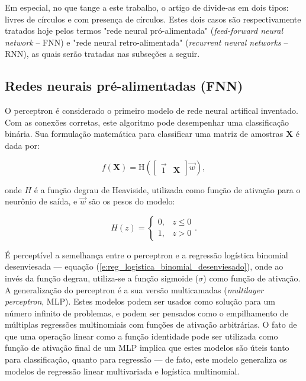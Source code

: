     Em especial, no que tange a este trabalho, o artigo de  divide-as em dois tipos: livres de círculos e com presença de círculos. Estes dois casos são respectivamente tratados hoje pelos termos "rede neural pró-alimentada" (\textit{feed-forward neural network} -- FNN) e "rede neural retro-alimentada" (\textit{recurrent neural networks} -- RNN), as quais serão tratadas nas subseções a seguir.

    \subsection{Redes neurais pré-alimentadas (FNN)} \label{s:fnn}

      O perceptron  é considerado o primeiro modelo de rede neural artifical inventado. Com as conexões corretas, este algoritmo pode desempenhar uma classificação binária. Sua formulação matemática para classificar uma matriz de amostras $\boldsymbol{X}$ é dada por:

    \begin{equation} \label{e:perceptron_original}
      f(\boldsymbol{X}) = \text{H}\left( \begin{bmatrix} \vec{1} & \boldsymbol{X}\end{bmatrix} \vec{w} \right)
      ,
    \end{equation}

    \noindent onde $H$ é a função degrau de Heaviside, utilizada como função de ativação para o neurônio de saída, e $\vec{w}$ são os pesos do modelo:

    \begin{equation} \label{e:heaviside}
      H(z) = \begin{cases}
        0, & z \le 0 \\
        1, & z > 0
      \end{cases}
      .
    \end{equation}

    É perceptível a semelhança entre o perceptron e a regressão logística binomial desenviesada --- equação (\ref{e:reg_logistica_binomial_desenviesado}), onde ao invés da função degrau, utiliza-se a função sigmoide ($\sigma$) como função de ativação. A generalização do perceptron é a sua versão multicamadas (\textit{multilayer perceptron}, MLP). Estes modelos podem ser usados como solução para um número infinito de problemas, e podem ser pensados como o empilhamento de múltiplas regressões multinomiais com funções de ativação arbitrárias. O fato de que uma operação linear como a função identidade pode ser utilizada como função de ativação final de um MLP implica que estes modelos são úteis tanto para classificação, quanto para regressão  --- de fato, este modelo generaliza os modelos de regressão linear multivariada e logística multinomial.

